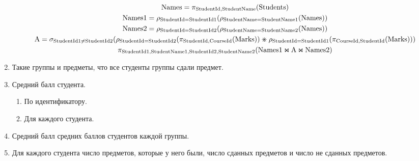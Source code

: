 \documentclass{article}
\newcommand{\Students}{\mathrm{Students}}
\newcommand{\StudentId}{\mathrm{StudentId}}
\newcommand{\StudentName}{\mathrm{StudentName}}
\newcommand{\CourseId}{\mathrm{CourseId}}
\newcommand{\Marks}{\mathrm{Marks}}
\newcommand{\join}{\mathbin{\mathrlap{\ltimes}{\rtimes}}}
\begin{document}
\begin{enumerate}
    \begin{gather*}
        \mathrm{Names} = \pi_{\StudentId, \StudentName}(\Students) \\
        \mathrm{Names1} =
            \rho_{\StudentId=\mathrm{StudentId1}}(
            \rho_{\StudentName=\mathrm{StudentName1}}(
            \mathrm{Names})) \\
        \mathrm{Names2} =
            \rho_{\StudentId=\mathrm{StudentId2}}(
            \rho_{\StudentName=\mathrm{StudentName2}}(
            \mathrm{Names})) \\
        \mathrm{A} =
            \sigma_{\mathrm{StudentId1} \neq \mathrm{StudentId2}}(
            \rho_{\StudentId=\mathrm{StudentId2}}(\pi_{\StudentId, \CourseId}(\Marks))
            \divideontimes
            \rho_{\StudentId=\mathrm{StudentId1}}(\pi_{\CourseId, \StudentId}(\Marks))) \\
        \pi_{\mathrm{StudentId1},\mathrm{StudentName1},
             \mathrm{StudentId2},\mathrm{StudentName2}}(
        \mathrm{Names1} \join \mathrm{A} \join \mathrm{Names2}
        )
    \end{gather*}
    \item Такие группы и предметы, что все студенты группы сдали предмет.
    \item Средний балл студента.
    \begin{enumerate}
        \item По идентификатору.
        \item Для каждого студента.
    \end{enumerate}
    \item Средний балл средних баллов студентов каждой группы.
    \item Для каждого студента число предметов, которые у него были, число сданных предметов и число не сданных предметов.
\end{enumerate}
\end{document}
